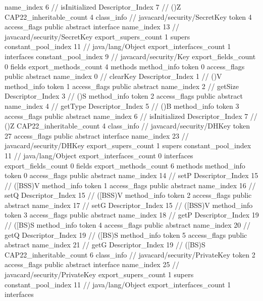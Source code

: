 {{{{{					name_index	6		// isInitialized
					Descriptor_Index	7		// ()Z
				}
			}
			CAP22_inheritable_count	4
		}
		class_info {		// javacard/security/SecretKey
			token	4
			access_flags	public abstract interface
			name_index	13		// javacard/security/SecretKey
			export_supers_count	1
			supers {
				constant_pool_index	11		// java/lang/Object
			}
			export_interfaces_count	1
			interfaces {
				constant_pool_index	9		// javacard/security/Key
			}
			export_fields_count	0
			fields {
			}
			export_methods_count	4
			methods {
				method_info {
					token	0
					access_flags	public abstract
					name_index	0		// clearKey
					Descriptor_Index	1		// ()V
				}
				method_info {
					token	1
					access_flags	public abstract
					name_index	2		// getSize
					Descriptor_Index	3		// ()S
				}
				method_info {
					token	2
					access_flags	public abstract
					name_index	4		// getType
					Descriptor_Index	5		// ()B
				}
				method_info {
					token	3
					access_flags	public abstract
					name_index	6		// isInitialized
					Descriptor_Index	7		// ()Z
				}
			}
			CAP22_inheritable_count	4
		}
		class_info {		// javacard/security/DHKey
			token	27
			access_flags	public abstract interface
			name_index	23		// javacard/security/DHKey
			export_supers_count	1
			supers {
				constant_pool_index	11		// java/lang/Object
			}
			export_interfaces_count	0
			interfaces {
			}
			export_fields_count	0
			fields {
			}
			export_methods_count	6
			methods {
				method_info {
					token	0
					access_flags	public abstract
					name_index	14		// setP
					Descriptor_Index	15		// ([BSS)V
				}
				method_info {
					token	1
					access_flags	public abstract
					name_index	16		// setQ
					Descriptor_Index	15		// ([BSS)V
				}
				method_info {
					token	2
					access_flags	public abstract
					name_index	17		// setG
					Descriptor_Index	15		// ([BSS)V
				}
				method_info {
					token	3
					access_flags	public abstract
					name_index	18		// getP
					Descriptor_Index	19		// ([BS)S
				}
				method_info {
					token	4
					access_flags	public abstract
					name_index	20		// getQ
					Descriptor_Index	19		// ([BS)S
				}
				method_info {
					token	5
					access_flags	public abstract
					name_index	21		// getG
					Descriptor_Index	19		// ([BS)S
				}
			}
			CAP22_inheritable_count	6
		}
		class_info {		// javacard/security/PrivateKey
			token	2
			access_flags	public abstract interface
			name_index	25		// javacard/security/PrivateKey
			export_supers_count	1
			supers {
				constant_pool_index	11		// java/lang/Object
			}
			export_interfaces_count	1
			interfaces {
}}}}
